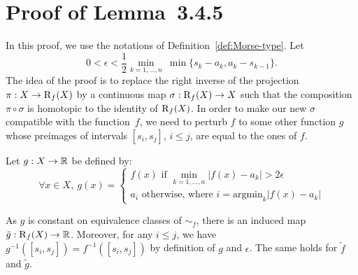 
\chapter{Proof of Lemma~3.4.5} %
\label{sec:proof_pdreeb}

In this proof, we use the notations of Definition~\ref{def:Morse-type}.
Let $$0<\epsilon<\frac{1}{2}\min_{k=1,...,n}\ \min\{s_k-a_k,a_k-s_{k-1}\}.$$ %
The idea of the proof is to replace the right inverse of the
projection $\pi:X\to\mathrm{R}_f(X)$ by a continuous map
$\sigma:\mathrm{R}_f(X)\to X$ such that the composition $\pi\circ\sigma$ is
homotopic to the identity of $\mathrm{R}_f(X)$. In order to make our new
$\sigma$ compatible with the function~$f$, we need to perturb $f$ to
some other function $g$ whose
preimages of intervals $[s_i,s_j]$, $i\leq j$, 
are equal to the ones of $f$.

Let $g:X\rightarrow\mathbb{R}$ be defined by:
$$\forall x\in X,\ g(x)=\left\{ \begin{array}{l} f(x)\text{   if }\displaystyle\min_{k=1,...,n} |f(x)-a_k|>2\epsilon \\
						a_i\text{   otherwise, where }i=\text{argmin}_k|f(x)-a_k| \end{array} \right.$$

As $g$ is constant on equivalence classes of $\sim_f$,  there is an induced map $\tilde{g}:\mathrm{R}_f(X)\rightarrow\mathbb{R}$.
Moreover, for any $i\leq j$, we have $g^{-1}([s_i,s_j])=f^{-1}([s_i,s_j])$ by definition of $g$ and $\epsilon$. The
same holds for $\tilde f$ and $\tilde g$.


